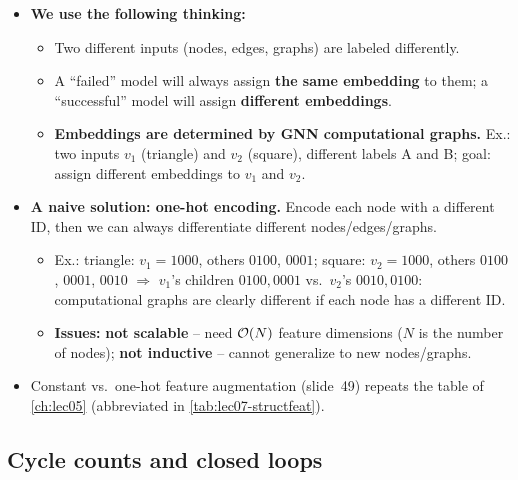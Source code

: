\begin{itemize}
  \item \textbf{We use the following thinking:}
    \begin{itemize}
      \item Two different inputs (nodes, edges, graphs) are labeled differently.
      \item A ``failed'' model will always assign \textbf{the same embedding} to
        them; a ``successful'' model will assign \textbf{different embeddings}.
      \item \textbf{Embeddings are determined by GNN computational graphs.} Ex.:
        two inputs $v_1$ (triangle) and $v_2$ (square), different labels A and B;
        goal: assign different embeddings to $v_1$ and $v_2$.
    \end{itemize}
  \item \textbf{A naive solution: one-hot encoding.} Encode each node with a
    different ID, then we can always differentiate different nodes/edges/graphs.
    \begin{itemize}
      \item Ex.: triangle: $v_1=1000$, others $0100$, $0001$; square: $v_2=1000$,
        others $0100$, $0001$, $0010$ $\Rightarrow$ $v_1$'s children $0100,0001$
        vs.\ $v_2$'s $0010,0100$: computational graphs are clearly different if
        each node has a different ID.
      \item \textbf{Issues:} \textbf{not scalable} -- need $\mathcal{O}(N)$ feature
        dimensions ($N$ is the number of nodes); \textbf{not inductive} -- cannot
        generalize to new nodes/graphs.
    \end{itemize}
  \item Constant vs.\ one-hot feature augmentation (slide~49) repeats the table
    of \cref{ch:lec05} (abbreviated in \cref{tab:lec07-structfeat}).
\end{itemize}

\subsection{Cycle counts and closed loops}\label{sec:lec07-cycles}

